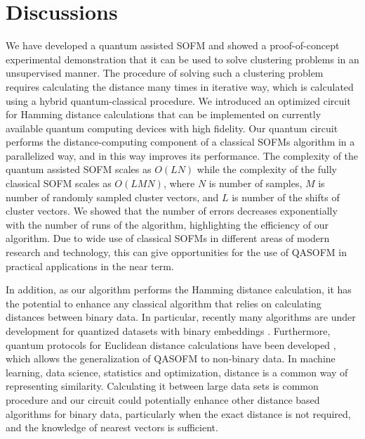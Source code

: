 \documentclass[%
  pra, aps, physrev,
  showkeys,
  twocolumn,
  showpacs,
  superscriptaddress,
  amsmath,amssymb,
  10pt
]{revtex4-2}
\begin{document}
\section{Discussions}
We have developed a quantum assisted SOFM and showed a proof-of-concept experimental demonstration
that it can be used to solve clustering problems in an unsupervised manner.
The procedure of solving such a clustering problem requires calculating the distance many times in iterative way,
which is calculated using a hybrid quantum-classical procedure.
We introduced an optimized circuit for Hamming distance calculations that can be implemented on currently available quantum computing devices with high fidelity.
Our quantum circuit performs the distance-computing component of a classical SOFMs algorithm in a parallelized way,
and in this way improves its performance.
The complexity of the quantum assisted SOFM scales as $O(LN)$
while the complexity of the fully classical SOFM scales as $O(LMN)$,
where $N$ is number of samples, $M$ is number of randomly sampled cluster vectors,
and $L$ is number of the shifts of cluster vectors.  We showed that the number of errors decreases exponentially with the number of runs of the algorithm, highlighting the efficiency of our algorithm. Due to wide use of classical SOFMs in different areas of modern research and technology,
this can give opportunities for the use of QASOFM in practical applications in the near term.

In addition, as our algorithm performs the Hamming distance calculation,
it has the potential to enhance any classical algorithm that relies on calculating distances between binary data. In particular, recently many algorithms are under development for quantized datasets with binary embeddings \cite{zhuangFastTrainingTripletBased2016,yiBinaryEmbeddingFundamental2015,AsymmetricDistancesBinary}. Furthermore, quantum protocols for Euclidean distance calculations have been developed \cite{yuQuantumAlgorithmsSimilarity2020,zardiniQuantumKnearestNeighbors2024}, which allows the generalization of QASOFM to non-binary data. In machine learning, data science, statistics and optimization, distance is a common way of representing similarity.  Calculating it between large data sets is common procedure
and our circuit could potentially enhance other distance based algorithms for binary data, particularly when the exact distance is not required,
and the knowledge of nearest vectors is sufficient.
\end{document}
